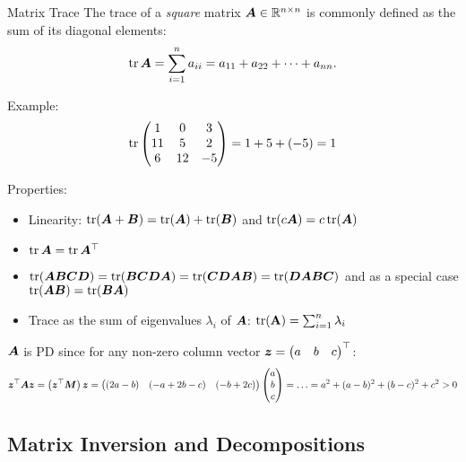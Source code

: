 \begin{frame}{Matrix Trace}
    The trace of a \emph{square} matrix $\bm{A} \in \mathbb{R}^{n \times n}$ is commonly defined as the sum of its diagonal elements:
    $$\tr \bm{A} = \sum_{i=1}^n a_{ii} = a_{11} + a_{22} + \dots + a_{nn}.$$

    Example:
    $$
        \tr \begin{pmatrix}
            1  & 0  & 3  \\
            11 & 5  & 2  \\
            6  & 12 & -5
        \end{pmatrix} = 1 + 5 + (-5) = 1
    $$

    Properties:
    \begin{itemize}
        \item Linearity: $\tr(\bm{A} + \bm{B}) = \tr(\bm{A}) + \tr(\bm{B})$ and $\tr(c\bm{A}) = c \tr(\bm{A})$
        \item $\tr \bm{A} = \tr \bm{A}^\top$
        \item $\tr(\bm{A}\bm{B}\bm{C}\bm{D}) = \tr(\bm{B}\bm{C}\bm{D}\bm{A}) = \tr(\bm{C}\bm{D}\bm{A}\bm{B}) = \tr(\bm{D}\bm{A}\bm{B}\bm{C})$
              and as a special case $\tr(\bm{A} \bm{B}) =  \tr(\bm{B} \bm{A})$
        \item Trace as the sum of eigenvalues $\lambda_i$ of $\bm{A}$: $\tr(\mathbf{A}) = \sum_{i=1}^n \lambda_i$
    \end{itemize}

\end{frame}

{   $\bm{A}$ is PD since for any non-zero column vector $\v z = \mqty(a & b & c)^\top$:
    $$
        \bm{z}^\top \bm{A} \bm{z} = \left(\bm{z}^\top \bm{M}\right) \bm{z}
        = \begin{pmatrix} (2a - b) & (-a + 2b - c) & (-b + 2c) \end{pmatrix}
        \begin{pmatrix} a \\ b \\ c \end{pmatrix} = \ldots =  a^2 + (a - b)^2 + (b - c)^2 + c^2 > 0
    $$
}

\subsection{Matrix Inversion and Decompositions}

